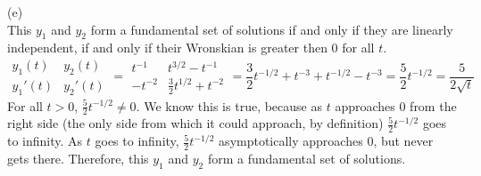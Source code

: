 \documentclass[a4paper, 11pt]{report}
\begin{document}
\sol (e) \\
This $y_1$ and $y_2$ form a fundamental set of solutions if and only if they are linearly independent, if and only if their Wronskian is greater then 0 for all $t$.
$$
  \begin{array}{|cc|} y_1(t) & y_2(t) \\ y_1'(t) & y_2'(t) \end{array}
    = \begin{array}{|cc|} t^{-1} & t^{3/2} - t^{-1} \\ -t^{-2} & \frac{3}{2}t^{1/2} + t^{-2} \end{array} 
    = \frac{3}{2}t^{-1/2} + t^{-3} + t^{-1/2} - t^{-3}
    = \frac{5}{2}t^{-1/2}
    = \frac{5}{2\sqrt{t}}
$$
For all $t>0$, $\frac{5}{2}t^{-1/2}\neq0$. We know this is true, because as $t$ approaches 0 from the right side (the only side from which it could approach, by definition) $\frac{5}{2}t^{-1/2}$ goes to infinity. As $t$ goes to infinity, $\frac{5}{2}t^{-1/2}$ asymptotically approaches $0$, but never gets there. Therefore, this $y_1$ and $y_2$ form a fundamental set of solutions.
\end{document}
